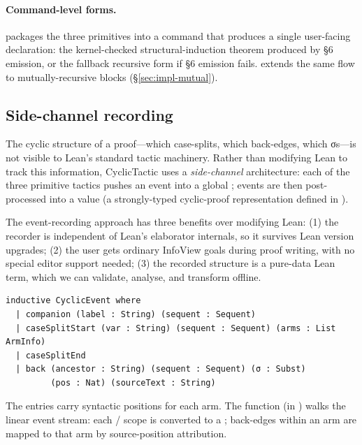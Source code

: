 \paragraph{Command-level forms.}
 packages the three
primitives into a command that produces a single user-facing declaration:
the kernel-checked structural-induction theorem produced by §6 emission, or
the fallback recursive form if §6 emission fails.  extends the same flow to mutually-recursive blocks
(§\ref{sec:impl-mutual}).

\subsection{Side-channel recording}

The cyclic structure of a proof---which case-splits, which back-edges, which
σs---is not visible to Lean's standard tactic machinery. Rather than
modifying Lean to track this information, CyclicTactic uses a
\emph{side-channel} architecture: each of the three primitive tactics pushes
an event into a global  ; events are then
post-processed into a  value (a strongly-typed cyclic-proof
representation defined in ).

The event-recording approach has three benefits over modifying Lean:
(1) the recorder is independent of Lean's elaborator internals, so it
survives Lean version upgrades; (2) the user gets ordinary InfoView goals
during proof writing, with no special editor support needed; (3) the
recorded structure is a pure-data Lean term, which we can validate, analyse,
and transform offline.

\begin{lstlisting}
inductive CyclicEvent where
  | companion (label : String) (sequent : Sequent)
  | caseSplitStart (var : String) (sequent : Sequent) (arms : List ArmInfo)
  | caseSplitEnd
  | back (ancestor : String) (sequent : Sequent) (σ : Subst)
         (pos : Nat) (sourceText : String)
\end{lstlisting}

The  entries carry syntactic positions for each arm. The
 function (in )
walks the linear event stream: each /
scope is converted to a ; back-edges within an arm
are mapped to that arm by source-position attribution.

